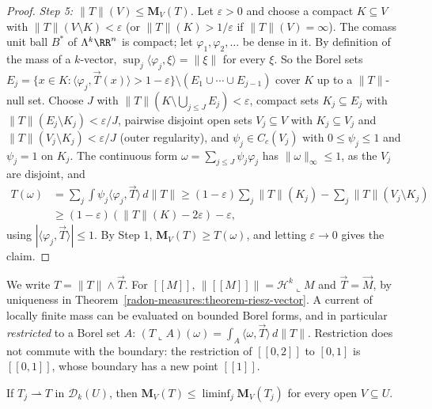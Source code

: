 \begin{proof}
\emph{Step 5: $\|T\|(V) \leq \mathbf{M}_V(T)$.} Let $\varepsilon > 0$ and choose a compact $K \subseteq V$ with $\|T\|(V \setminus K) < \varepsilon$ (or $\|T\|(K) > 1/\varepsilon$ if $\|T\|(V) = \infty$). The comass unit ball
$B^*$ of $\Lambda^k\RR^n$ is compact; let $\varphi_1, \varphi_2, \ldots$ be dense in it. By definition of the mass of a $k$-vector, $\sup_j\langle\varphi_j, \xi\rangle = \|\xi\|$ for every $\xi$. So the Borel sets
$E_j = \{x \in K : \langle\varphi_j, \vec{T}(x)\rangle > 1 - \varepsilon\} \setminus (E_1 \cup \cdots \cup E_{j-1})$ cover $K$ up to a $\|T\|$-null set. Choose $J$ with $\|T\|(K \setminus \bigcup_{j \leq J}E_j) < \varepsilon$, compact
sets $K_j \subseteq E_j$ with $\|T\|(E_j \setminus K_j) < \varepsilon/J$, pairwise disjoint open sets $V_j \subseteq V$ with $K_j \subseteq V_j$ and $\|T\|(V_j \setminus K_j) < \varepsilon/J$ (outer regularity), and
$\psi_j \in C_c(V_j)$ with $0 \leq \psi_j \leq 1$ and $\psi_j = 1$ on $K_j$. The continuous form $\omega = \sum_{j \leq J}\psi_j\varphi_j$ has $\|\omega\|_\infty \leq 1$, as the $V_j$ are disjoint, and
\[
\begin{aligned}
T(\omega) &= \sum_j\int\psi_j\langle\varphi_j, \vec{T}\rangle\,d\|T\| \geq (1 - \varepsilon)\sum_j\|T\|(K_j) - \sum_j\|T\|(V_j \setminus K_j) \\
&\geq (1 - \varepsilon)(\|T\|(K) - 2\varepsilon) - \varepsilon,
\end{aligned}
\]
using $|\langle\varphi_j, \vec{T}\rangle| \leq 1$. By Step 1, $\mathbf{M}_V(T) \geq T(\omega)$, and letting $\varepsilon \to 0$ gives the claim.
\end{proof}

We write $T = \|T\| \wedge \vec{T}$. For $[\![M]\!]$, $\|[\![M]\!]\| = \mathcal{H}^k\llcorner M$ and $\vec{T} = \vec{M}$, by uniqueness in Theorem~\ref{radon-measures:theorem-riesz-vector}. A current of locally finite mass
can be evaluated on bounded Borel forms, and in particular \emph{restricted} to a Borel set $A$: $(T\llcorner A)(\omega) = \int_A\langle\omega, \vec{T}\rangle\,d\|T\|$. Restriction does not commute with the boundary: the
restriction of $[\![0, 2]\!]$ to $[0, 1]$ is $[\![0, 1]\!]$, whose boundary has a new point $[\![1]\!]$.

\begin{proposition}\label{currents:proposition-mass-lsc}
If $T_j \rightharpoonup T$ in $\mathcal{D}_k(U)$, then $\mathbf{M}_V(T) \leq \liminf_j\mathbf{M}_V(T_j)$ for every open $V \subseteq U$.
\end{proposition}

